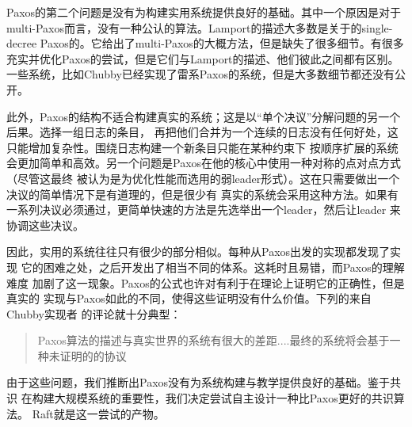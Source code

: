 Paxos的第二个问题是没有为构建实用系统提供良好的基础。其中一个原因是对于multi-Paxos而言，没有一种公认的算法。Lamport的描述大多数是关于的single-decree Paxos的。它给出了multi-Paxos的大概方法，但是缺失了很多细节。有很多充实并优化Paxos的尝试，但是它们与Lamport的描述、他们彼此之间都有区别。一些系统，比如Chubby已经实现了雷系Paxos的系统，但是大多数细节都还没有公开。

此外，Paxos的结构不适合构建真实的系统；这是以“单个决议”分解问题的另一个后果。选择一组日志的条目，
再把他们合并为一个连续的日志没有任何好处，这只能增加复杂性。围绕日志构建一个新条目只能在某种约束下
按顺序扩展的系统会更加简单和高效。另一个问题是Paxos在他的核心中使用一种对称的点对点方式（尽管这最终
被认为是为优化性能而选用的弱leader形式）。这在只需要做出一个决议的简单情况下是有道理的，但是很少有
真实的系统会采用这种方法。如果有一系列决议必须通过，更简单快速的方法是先选举出一个leader，然后让leader
来协调这些决议。

因此，实用的系统往往只有很少的部分相似。每种从Paxos出发的实现都发现了实现
它的困难之处，之后开发出了相当不同的体系。这耗时且易错，而Paxos的理解难度
加剧了这一现象。Paxos的公式也许对有利于在理论上证明它的正确性，但是真实的
实现与Paxos如此的不同，使得这些证明没有什么价值。下列的来自Chubby实现者
的评论就十分典型：
\begin{quote}
    Paxos算法的描述与真实世界的系统有很大的差距....最终的系统将会基于一种未证明的的协议
\end{quote}

由于这些问题，我们推断出Paxos没有为系统构建与教学提供良好的基础。鉴于共识
在构建大规模系统的重要性，我们决定尝试自主设计一种比Paxos更好的共识算法。
Raft就是这一尝试的产物。

